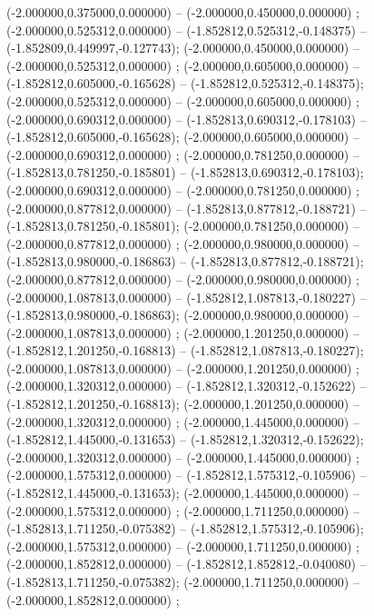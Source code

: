  (-2.000000,0.375000,0.000000) -- (-2.000000,0.450000,0.000000) ;
 (-2.000000,0.525312,0.000000) -- (-1.852812,0.525312,-0.148375) -- (-1.852809,0.449997,-0.127743);
 (-2.000000,0.450000,0.000000) -- (-2.000000,0.525312,0.000000) ;
 (-2.000000,0.605000,0.000000) -- (-1.852812,0.605000,-0.165628) -- (-1.852812,0.525312,-0.148375);
 (-2.000000,0.525312,0.000000) -- (-2.000000,0.605000,0.000000) ;
 (-2.000000,0.690312,0.000000) -- (-1.852813,0.690312,-0.178103) -- (-1.852812,0.605000,-0.165628);
 (-2.000000,0.605000,0.000000) -- (-2.000000,0.690312,0.000000) ;
 (-2.000000,0.781250,0.000000) -- (-1.852813,0.781250,-0.185801) -- (-1.852813,0.690312,-0.178103);
 (-2.000000,0.690312,0.000000) -- (-2.000000,0.781250,0.000000) ;
 (-2.000000,0.877812,0.000000) -- (-1.852813,0.877812,-0.188721) -- (-1.852813,0.781250,-0.185801);
 (-2.000000,0.781250,0.000000) -- (-2.000000,0.877812,0.000000) ;
 (-2.000000,0.980000,0.000000) -- (-1.852813,0.980000,-0.186863) -- (-1.852813,0.877812,-0.188721);
 (-2.000000,0.877812,0.000000) -- (-2.000000,0.980000,0.000000) ;
 (-2.000000,1.087813,0.000000) -- (-1.852812,1.087813,-0.180227) -- (-1.852813,0.980000,-0.186863);
 (-2.000000,0.980000,0.000000) -- (-2.000000,1.087813,0.000000) ;
 (-2.000000,1.201250,0.000000) -- (-1.852812,1.201250,-0.168813) -- (-1.852812,1.087813,-0.180227);
 (-2.000000,1.087813,0.000000) -- (-2.000000,1.201250,0.000000) ;
 (-2.000000,1.320312,0.000000) -- (-1.852812,1.320312,-0.152622) -- (-1.852812,1.201250,-0.168813);
 (-2.000000,1.201250,0.000000) -- (-2.000000,1.320312,0.000000) ;
 (-2.000000,1.445000,0.000000) -- (-1.852812,1.445000,-0.131653) -- (-1.852812,1.320312,-0.152622);
 (-2.000000,1.320312,0.000000) -- (-2.000000,1.445000,0.000000) ;
 (-2.000000,1.575312,0.000000) -- (-1.852812,1.575312,-0.105906) -- (-1.852812,1.445000,-0.131653);
 (-2.000000,1.445000,0.000000) -- (-2.000000,1.575312,0.000000) ;
 (-2.000000,1.711250,0.000000) -- (-1.852813,1.711250,-0.075382) -- (-1.852812,1.575312,-0.105906);
 (-2.000000,1.575312,0.000000) -- (-2.000000,1.711250,0.000000) ;
 (-2.000000,1.852812,0.000000) -- (-1.852812,1.852812,-0.040080) -- (-1.852813,1.711250,-0.075382);
 (-2.000000,1.711250,0.000000) -- (-2.000000,1.852812,0.000000) ;
